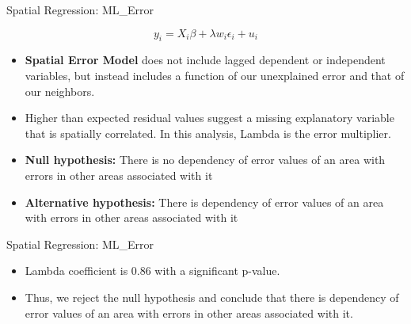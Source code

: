 \documentclass[10pt, aspectratio=169]{beamer}
\begin{document}
\begin{frame}{Spatial Regression: ML\_Error}

    \begin{equation} 
        y_i=X_i \beta+\lambda w_i \epsilon_i+u_i
    \end{equation}
    
    \begin{itemize}
         
        \item \textbf{Spatial Error Model} does not include lagged dependent or independent variables, but instead includes a function of our unexplained error and that of our neighbors.
        \item \textbf{}Higher than expected residual values suggest a missing explanatory variable that is spatially correlated. In this analysis, Lambda is the error multiplier.
        \item \textbf{Null hypothesis:} There is no dependency of error values of an area with errors in other areas associated with it
        \item \textbf{Alternative hypothesis:} There is dependency of error values of an area with errors in other areas associated with it
        
    \end{itemize}
\end{frame}

\begin{frame}{Spatial Regression: ML\_Error}
    \small\begin{table}[!h]
        
        \caption{\label{tab:ml_error_summary} Estimation results of ML\_Error regression.}
    \end{table}
    \begin{itemize}
         
        \item \textbf{}Lambda coefficient is 0.86 with a significant p-value.
        \item \textbf{}Thus, we reject the null hypothesis and conclude that there is dependency of error values of an area with errors in other areas associated with it.
              
    \end{itemize}
    
\end{frame}
\end{document}
